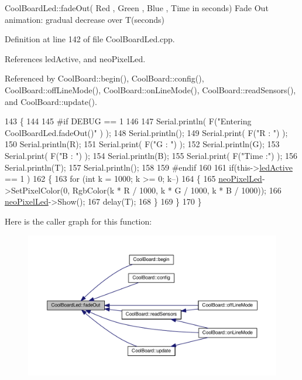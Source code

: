 Cool\+Board\+Led\+::fade\+Out( Red , Green , Blue , Time in seconds) Fade Out animation\+: gradual decrease over T(seconds) 

Definition at line 142 of file Cool\+Board\+Led.\+cpp.



References led\+Active, and neo\+Pixel\+Led.



Referenced by Cool\+Board\+::begin(), Cool\+Board\+::config(), Cool\+Board\+::off\+Line\+Mode(), Cool\+Board\+::on\+Line\+Mode(), Cool\+Board\+::read\+Sensors(), and Cool\+Board\+::update().


\begin{DoxyCode}
143 \{
144 
145 \textcolor{preprocessor}{#if DEBUG == 1 }
146 
147     Serial.println( F(\textcolor{stringliteral}{"Entering CoolBoardLed.fadeOut()"} ) );
148     Serial.println();
149     Serial.print( F(\textcolor{stringliteral}{"R : "}) );
150     Serial.println(R);
151     Serial.print( F(\textcolor{stringliteral}{"G : "}) );
152     Serial.println(G);
153     Serial.print( F(\textcolor{stringliteral}{"B : "}) );
154     Serial.println(B);
155     Serial.print( F(\textcolor{stringliteral}{"Time :"}) );
156     Serial.println(T);
157     Serial.println();
158 
159 \textcolor{preprocessor}{#endif  }
160 
161     \textcolor{keywordflow}{if}(this->\hyperlink{classCoolBoardLed_a5f17c135516fcf4b44ea8a096ba0177a}{ledActive} == 1 )
162     \{
163         \textcolor{keywordflow}{for} (\textcolor{keywordtype}{int} k = 1000; k >= 0; k--) 
164         \{
165             \hyperlink{classCoolBoardLed_ac2c13fa462a010cd9242bf297c013923}{neoPixelLed}->SetPixelColor(0, RgbColor(k * R / 1000, k * G / 1000, k * B / 1000));
166             \hyperlink{classCoolBoardLed_ac2c13fa462a010cd9242bf297c013923}{neoPixelLed}->Show();
167             delay(T);
168         \}
169     \}
170 \}
\end{DoxyCode}
Here is the caller graph for this function\+:\nopagebreak
\begin{figure}[H]
\begin{center}
\leavevmode
\includegraphics[width=350pt]{classCoolBoardLed_a93d545679237e8cc858324367149775c_icgraph}
\end{center}
\end{figure}
\mbox{\label{classCoolBoardLed_a8ed3053a36f0ed4a131f43b5b17efb61}} 
